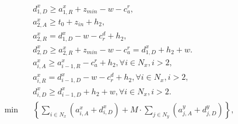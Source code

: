 \begin{align}
  & d_{1 , D}^{x} \geq a_{1 , R}^{x} + z_{\mathit{min}} - w - c_{a}^{r} , \tag{eq\_0055} \\
  & a_{2 , A}^{x} \geq t_{0} + z_{i n} + h_{2} , \tag{eq\_0056} \\
  & a_{2 , R}^{x} = d_{1 , D}^{x} - w - c_{r}^{d} + h_{2} , \tag{eq\_0057} \\
  & d_{2 , D}^{x} \geq a_{2 , R}^{x} + z_{\mathit{min}} - w - c_{a}^{r} = d_{1 , D}^{x} + h_{2} + w . \tag{eq\_0058} \\
  & a_{i , A}^{x} \geq a_{i - 1 , R}^{x} - c_{a}^{r} + h_{2} , \forall i \in N_{x} , i > 2 , \tag{eq\_0059} \\
  & a_{i , R}^{x} = d_{i - 1 , D}^{x} - w - c_{r}^{d} + h_{2} , \forall i \in N_{x} , i > 2 , \tag{eq\_0060} \\
  & d_{i , D}^{x} \geq d_{i - 1 , D}^{x} + h_{2} + w , \forall i \in N_{x} , i > 2 . \tag{eq\_0061} \\
  \min\quad & \left\{\sum_{i \in N_{x}} \left(a_{i , A}^{x} + d_{i , D}^{x}\right) + M \cdot \sum_{j \in N_{y}} \left(a_{j , A}^{y} + d_{j , D}^{y}\right)\right\} , \tag{eq\_0062} \\
\end{align}
